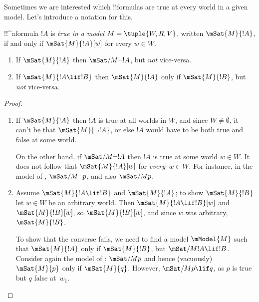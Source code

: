 \documentclass[../../../include/open-logic-section]{subfiles}
\begin{document}


Sometimes we are interested which !!{formula}s are true at every world
in a given model. Let's introduce a notation for this.

\begin{defn}
  !!^a{formula} $!A$ is \emph{true in a model} $M = \tuple{W, R,
    V}$, written $\mSat{M}{!A}$, if and only if $\mSat{M}{!A}[w]$
  for every $w \in W$.
\end{defn}

\begin{prop}
  \begin{enumerate}
  \item If $\mSat{M}{!A}$ then $\mSat/{M}{\lnot !A}$, but \emph{not}
    vice-versa.
  \item If $\mSat{M}{!A \lif !B}$ then $\mSat{M}{!A}$ only if
    $\mSat{M}{!B}$, but \emph{not} vice-versa.
  \end{enumerate}
\end{prop}

\begin{proof}
  \begin{enumerate}
  \item If $\mSat{M}{!A}$ then $!A$ is true at all worlds in $W$, and
    since $W \neq \emptyset$, it can't be that $\mSat{M}{\lnot!A}$, or
    else $!A$ would have to be both true and false at some
    world.

    On the other hand, if $\mSat/{M}{\lnot !A}$ then $!A$ is true at
    some world $w \in W$. It does not follow that $\mSat{M}{!A}[w]$
    for \emph{every}~$w \in W$. For instance, in the model of
    , $\mSat/{M}{\lnot p}$, and also $\mSat/{M}{p}$.
  \item Assume $\mSat{M}{!A \lif !B}$ and $\mSat{M}{!A}$; to show
    $\mSat{M}{!B}$ let $w \in W$ be an arbitrary world. Then
    $\mSat{M}{!A \lif !B}[w]$ and $\mSat{M}{!B}[w]$, so
    $\mSat{M}{!B}[w]$, and since $w$ was arbitrary,
    $\mSat{M}{!B}$.

    To show that the converse fails, we need to find a model
    $\mModel{M}$ such that $\mSat{M}{!A}$ only if $\mSat{M}{!B}$, but
    $\mSat/{M}{!A \lif !B}$. Consider again the model of
    : $\mSat/{M}{p}$ and hence (vacuously)
    $\mSat{M}{p}$ only if $\mSat{M}{q}$. However, $\mSat/{M}{p \lif
      q}$, as $p$ is true but $q$ false at~$w_1$.
  \end{enumerate}
\end{proof}
\end{document}
